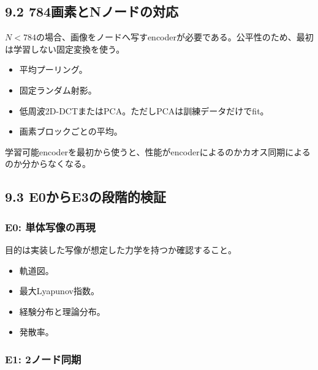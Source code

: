 \documentclass[11pt,a4paper]{ltjsarticle}
\begin{document}
\subsection*{\textcolor{researchblue}{9.2 784画素とNノードの対応}}

\(N<784\)の場合、画像をノードへ写すencoderが必要である。公平性のため、最初は学習しない固定変換を使う。\par

\begin{itemize}

\item 平均プーリング。

\item 固定ランダム射影。

\item 低周波2D-DCTまたはPCA。ただしPCAは訓練データだけでfit。

\item 画素ブロックごとの平均。

\end{itemize}

学習可能encoderを最初から使うと、性能がencoderによるのかカオス同期によるのか分からなくなる。\par

\subsection*{\textcolor{researchblue}{9.3 E0からE3の段階的検証}}

\subsubsection*{\textcolor{researchteal}{E0: 単体写像の再現}}

目的は実装した写像が想定した力学を持つか確認すること。\par

\begin{itemize}

\item 軌道図。

\item 最大Lyapunov指数。

\item 経験分布と理論分布。

\item 発散率。

\end{itemize}

\subsubsection*{\textcolor{researchteal}{E1: 2ノード同期}}
\end{document}
